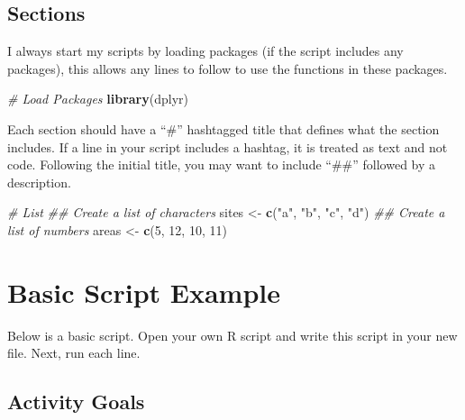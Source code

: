 \documentclass[
]{book}
\newenvironment{Shaded}{\begin{snugshade}}{\end{snugshade}}
\newcommand{\CommentTok}[1]{\textcolor[rgb]{0.56,0.35,0.01}{\textit{#1}}}
\newcommand{\DecValTok}[1]{\textcolor[rgb]{0.00,0.00,0.81}{#1}}
\newcommand{\KeywordTok}[1]{\textcolor[rgb]{0.13,0.29,0.53}{\textbf{#1}}}
\newcommand{\NormalTok}[1]{#1}
\newcommand{\StringTok}[1]{\textcolor[rgb]{0.31,0.60,0.02}{#1}}
\begin{document}
\hypertarget{sections}{%
\subsection*{Sections}\label{sections}}

I always start my scripts by loading packages (if the script includes any packages), this allows any lines to follow to use the functions in these packages.

\begin{Shaded}
\begin{Highlighting}[]
\CommentTok{\# Load Packages}
\KeywordTok{library}\NormalTok{(dplyr)}
\end{Highlighting}
\end{Shaded}

Each section should have a ``\#'' hashtagged title that defines what the section includes. If a line in your script includes a hashtag, it is treated as text and not code. Following the initial title, you may want to include ``\#\#'' followed by a description.

\begin{Shaded}
\begin{Highlighting}[]
\CommentTok{\# List}
\CommentTok{\#\# Create a list of characters}
\NormalTok{sites \textless{}{-}}\StringTok{ }\KeywordTok{c}\NormalTok{(}\StringTok{"a"}\NormalTok{, }\StringTok{"b"}\NormalTok{, }\StringTok{"c"}\NormalTok{, }\StringTok{"d"}\NormalTok{)}
\CommentTok{\#\# Create a list of numbers}
\NormalTok{areas \textless{}{-}}\StringTok{ }\KeywordTok{c}\NormalTok{(}\DecValTok{5}\NormalTok{, }\DecValTok{12}\NormalTok{, }\DecValTok{10}\NormalTok{, }\DecValTok{11}\NormalTok{) }
\end{Highlighting}
\end{Shaded}

\hypertarget{basic-script-example}{%
\section{Basic Script Example}\label{basic-script-example}}

Below is a basic script. Open your own R script and write this script in your new file. Next, run each line.

\hypertarget{activity-goals}{%
\subsection*{Activity Goals}\label{activity-goals}}
\end{document}
